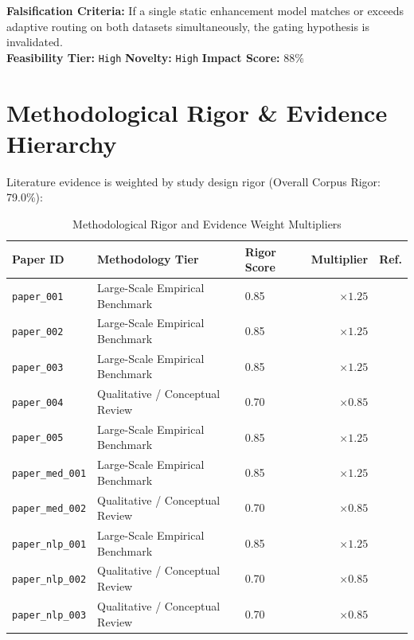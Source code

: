 \documentclass[11pt,a4paper]{article}
\begin{document}
\noindent\textbf{Falsification Criteria:} If a single static enhancement model matches or exceeds adaptive routing on both datasets simultaneously, the gating hypothesis is invalidated. \\
\noindent\textbf{Feasibility Tier:} \texttt{High} \quad \textbf{Novelty:} \texttt{High} \quad \textbf{Impact Score:} 88\%




\section{Methodological Rigor \& Evidence Hierarchy}
Literature evidence is weighted by study design rigor (Overall Corpus Rigor: 79.0\%):

\begin{table}[ht]
\centering
\caption{Methodological Rigor and Evidence Weight Multipliers}
\label{tab:rigor}
\begin{tabular}{lllrl}
\toprule
\textbf{Paper ID} & \textbf{Methodology Tier} & \textbf{Rigor Score} & \textbf{Multiplier} & \textbf{Ref.} \\
\midrule
    \texttt{paper\_001} & Large-Scale Empirical Benchmark & 0.85 & $\times 1.25$ & \cite{paper_001} \\
    \texttt{paper\_002} & Large-Scale Empirical Benchmark & 0.85 & $\times 1.25$ & \cite{paper_002} \\
    \texttt{paper\_003} & Large-Scale Empirical Benchmark & 0.85 & $\times 1.25$ & \cite{paper_003} \\
    \texttt{paper\_004} & Qualitative / Conceptual Review & 0.70 & $\times 0.85$ & \cite{paper_004} \\
    \texttt{paper\_005} & Large-Scale Empirical Benchmark & 0.85 & $\times 1.25$ & \cite{paper_005} \\
    \texttt{paper\_med\_001} & Large-Scale Empirical Benchmark & 0.85 & $\times 1.25$ & \cite{paper_med_001} \\
    \texttt{paper\_med\_002} & Qualitative / Conceptual Review & 0.70 & $\times 0.85$ & \cite{paper_med_002} \\
    \texttt{paper\_nlp\_001} & Large-Scale Empirical Benchmark & 0.85 & $\times 1.25$ & \cite{paper_nlp_001} \\
    \texttt{paper\_nlp\_002} & Qualitative / Conceptual Review & 0.70 & $\times 0.85$ & \cite{paper_nlp_002} \\
    \texttt{paper\_nlp\_003} & Qualitative / Conceptual Review & 0.70 & $\times 0.85$ & \cite{paper_nlp_003} \\
\bottomrule
\end{tabular}
\end{table}
\end{document}
